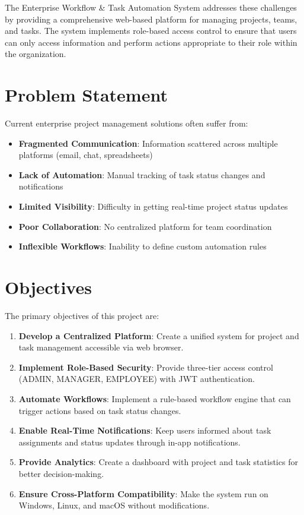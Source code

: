\documentclass[12pt,a4paper,twoside]{book}
\begin{document}
The Enterprise Workflow \& Task Automation System addresses these challenges by providing a comprehensive web-based platform for managing projects, teams, and tasks. The system implements role-based access control to ensure that users can only access information and perform actions appropriate to their role within the organization.

\section{Problem Statement}

Current enterprise project management solutions often suffer from:
\begin{itemize}
    \item \textbf{Fragmented Communication}: Information scattered across multiple platforms (email, chat, spreadsheets)
    \item \textbf{Lack of Automation}: Manual tracking of task status changes and notifications
    \item \textbf{Limited Visibility}: Difficulty in getting real-time project status updates
    \item \textbf{Poor Collaboration}: No centralized platform for team coordination
    \item \textbf{Inflexible Workflows}: Inability to define custom automation rules
\end{itemize}

\section{Objectives}

The primary objectives of this project are:

\begin{enumerate}
    \item \textbf{Develop a Centralized Platform}: Create a unified system for project and task management accessible via web browser.

    \item \textbf{Implement Role-Based Security}: Provide three-tier access control (ADMIN, MANAGER, EMPLOYEE) with JWT authentication.

    \item \textbf{Automate Workflows}: Implement a rule-based workflow engine that can trigger actions based on task status changes.

    \item \textbf{Enable Real-Time Notifications}: Keep users informed about task assignments and status updates through in-app notifications.

    \item \textbf{Provide Analytics}: Create a dashboard with project and task statistics for better decision-making.

    \item \textbf{Ensure Cross-Platform Compatibility}: Make the system run on Windows, Linux, and macOS without modifications.
\end{enumerate}
\end{document}
